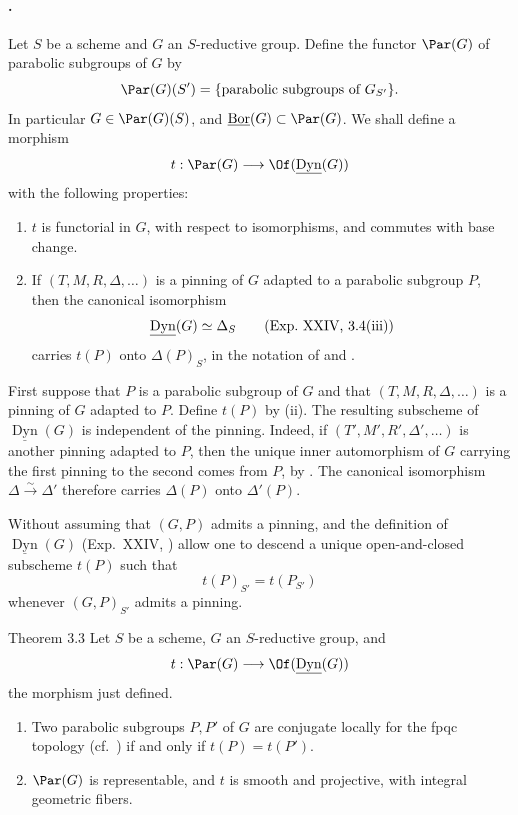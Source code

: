 \paragraph{.}
Let \(S\) be a scheme and \(G\) an \(S\)-reductive group.  Define the
functor \(\Par(G)\) of parabolic subgroups of \(G\) by
\[
 \Par(G)(S')
 =\{\text{parabolic subgroups of }G_{S'}\}.
\]
In particular \(G\in\Par(G)(S)\), and
\(\underline{\operatorname{Bor}}(G)\subset\Par(G)\).  We shall define a
morphism
\[
 t:\Par(G)\longrightarrow\Of(\underline{\operatorname{Dyn}}(G))
\]
with the following properties:
\begin{enumerate}[label=\textup{(\roman*)}]
\item \(t\) is functorial in \(G\), with respect to isomorphisms, and
commutes with base change.
\item If \((T,M,R,\Delta,\ldots)\) is a pinning of \(G\) adapted to a
parabolic subgroup \(P\), then the canonical isomorphism
\[
 \underline{\operatorname{Dyn}}(G)\simeq\Delta_S
\qquad\textup{(Exp.\ XXIV, 3.4(iii))}
\]
carries \(t(P)\) onto \(\Delta(P)_S\), in the notation of  and .
\end{enumerate}

First suppose that \(P\) is a parabolic subgroup of \(G\) and that
\((T,M,R,\Delta,\ldots)\) is a pinning of \(G\) adapted to \(P\).  Define
\(t(P)\) by (ii).  The resulting subscheme of
\(\underline{\operatorname{Dyn}}(G)\) is independent of the pinning.
Indeed, if \((T',M',R',\Delta',\ldots)\) is another pinning adapted to
\(P\), then the unique inner automorphism of \(G\) carrying the first
pinning to the second comes from \(P\), by .  The canonical
isomorphism \(\Delta\xrightarrow{\sim}\Delta'\) therefore carries
\(\Delta(P)\) onto \(\Delta'(P)\).

Without assuming that \((G,P)\) admits a pinning,  and the definition
of \(\underline{\operatorname{Dyn}}(G)\) (Exp.\ XXIV, ) allow one to
descend a unique open-and-closed subscheme \(t(P)\) such that
\[
 t(P)_{S'}=t(P_{S'})
\]
whenever \((G,P)_{S'}\) admits a pinning.

\begin{sgastatement}{Theorem 3.3}
Let \(S\) be a scheme, \(G\) an \(S\)-reductive group, and
\[
 t:\Par(G)\longrightarrow\Of(\underline{\operatorname{Dyn}}(G))
\]
the morphism just defined.
\begin{enumerate}[label=\textup{(\roman*)}]
\item Two parabolic subgroups \(P,P'\) of \(G\) are conjugate locally for
the fpqc topology \textup{(cf.\ )} if and only if \(t(P)=t(P')\).
\item{} \(\Par(G)\) is representable, and \(t\) is smooth and projective,
with integral geometric fibers.
\end{enumerate}
\end{sgastatement}

